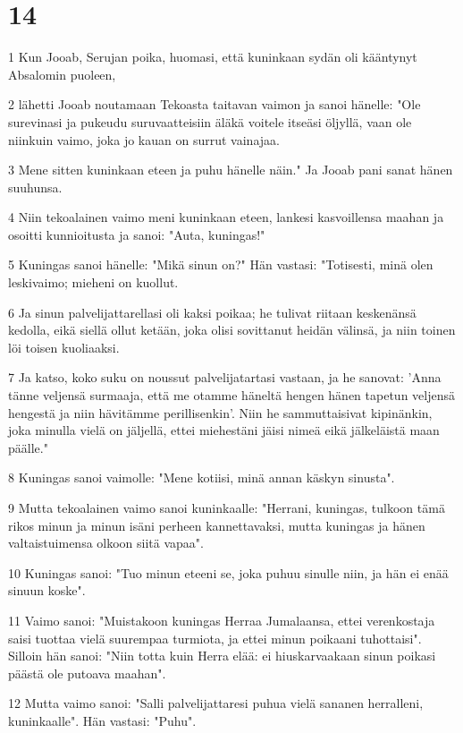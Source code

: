 \chapter{14}

\par 1 Kun Jooab, Serujan poika, huomasi, että kuninkaan sydän oli kääntynyt Absalomin puoleen,
\par 2 lähetti Jooab noutamaan Tekoasta taitavan vaimon ja sanoi hänelle: "Ole surevinasi ja pukeudu suruvaatteisiin äläkä voitele itseäsi öljyllä, vaan ole niinkuin vaimo, joka jo kauan on surrut vainajaa.
\par 3 Mene sitten kuninkaan eteen ja puhu hänelle näin." Ja Jooab pani sanat hänen suuhunsa.
\par 4 Niin tekoalainen vaimo meni kuninkaan eteen, lankesi kasvoillensa maahan ja osoitti kunnioitusta ja sanoi: "Auta, kuningas!"
\par 5 Kuningas sanoi hänelle: "Mikä sinun on?" Hän vastasi: "Totisesti, minä olen leskivaimo; mieheni on kuollut.
\par 6 Ja sinun palvelijattarellasi oli kaksi poikaa; he tulivat riitaan keskenänsä kedolla, eikä siellä ollut ketään, joka olisi sovittanut heidän välinsä, ja niin toinen löi toisen kuoliaaksi.
\par 7 Ja katso, koko suku on noussut palvelijatartasi vastaan, ja he sanovat: 'Anna tänne veljensä surmaaja, että me otamme häneltä hengen hänen tapetun veljensä hengestä ja niin hävitämme perillisenkin'. Niin he sammuttaisivat kipinänkin, joka minulla vielä on jäljellä, ettei miehestäni jäisi nimeä eikä jälkeläistä maan päälle."
\par 8 Kuningas sanoi vaimolle: "Mene kotiisi, minä annan käskyn sinusta".
\par 9 Mutta tekoalainen vaimo sanoi kuninkaalle: "Herrani, kuningas, tulkoon tämä rikos minun ja minun isäni perheen kannettavaksi, mutta kuningas ja hänen valtaistuimensa olkoon siitä vapaa".
\par 10 Kuningas sanoi: "Tuo minun eteeni se, joka puhuu sinulle niin, ja hän ei enää sinuun koske".
\par 11 Vaimo sanoi: "Muistakoon kuningas Herraa Jumalaansa, ettei verenkostaja saisi tuottaa vielä suurempaa turmiota, ja ettei minun poikaani tuhottaisi". Silloin hän sanoi: "Niin totta kuin Herra elää: ei hiuskarvaakaan sinun poikasi päästä ole putoava maahan".
\par 12 Mutta vaimo sanoi: "Salli palvelijattaresi puhua vielä sananen herralleni, kuninkaalle". Hän vastasi: "Puhu".
